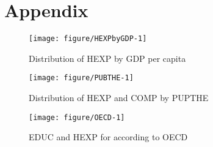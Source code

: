 \documentclass[12pt,a4paper]{article}\usepackage[]{graphicx}\usepackage[]{color}
\begin{document}
\newpage
\section{Appendix}
\begin{figure}[!htbp]

{\centering \texttt{[image: figure/HEXPbyGDP-1]} 

}

\caption[Distribution of HEXP by GDP per capita]{Distribution of HEXP by GDP per capita}\label{fig:HEXPbyGDP}
\end{figure}


\begin{figure}[!htbp]

{\centering \texttt{[image: figure/PUBTHE-1]} 

}

\caption[Distribution of HEXP and COMP by PUPTHE]{Distribution of HEXP and COMP by PUPTHE}\label{fig:PUBTHE}
\end{figure}


\begin{figure}[!htbp]

{\centering \texttt{[image: figure/OECD-1]} 

}

\caption[EDUC and HEXP for according to OECD]{EDUC and HEXP for according to OECD}\label{fig:OECD}
\end{figure}
\end{document}
